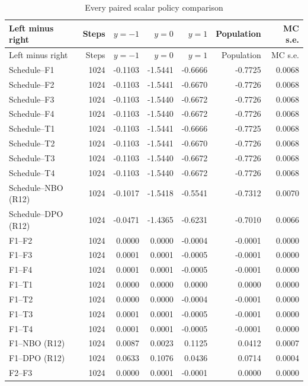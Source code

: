 \begingroup\small
\begin{longtable}{lrrrrrr}
\caption{Every paired scalar policy comparison}\label{tab:r15scalarpairs}\\
\toprule
Left minus right & Steps & $y=-1$ & $y=0$ & $y=1$ & Population & MC s.e. \\
\midrule
\endfirsthead
\toprule
Left minus right & Steps & $y=-1$ & $y=0$ & $y=1$ & Population & MC s.e. \\
\midrule
\endhead
Schedule--F1 & 1024 & -0.1103 & -1.5441 & -0.6666 & -0.7725 & 0.0068 \\
Schedule--F2 & 1024 & -0.1103 & -1.5441 & -0.6670 & -0.7726 & 0.0068 \\
Schedule--F3 & 1024 & -0.1103 & -1.5440 & -0.6672 & -0.7726 & 0.0068 \\
Schedule--F4 & 1024 & -0.1103 & -1.5440 & -0.6672 & -0.7726 & 0.0068 \\
Schedule--T1 & 1024 & -0.1103 & -1.5441 & -0.6666 & -0.7725 & 0.0068 \\
Schedule--T2 & 1024 & -0.1103 & -1.5441 & -0.6670 & -0.7726 & 0.0068 \\
Schedule--T3 & 1024 & -0.1103 & -1.5440 & -0.6672 & -0.7726 & 0.0068 \\
Schedule--T4 & 1024 & -0.1103 & -1.5440 & -0.6672 & -0.7726 & 0.0068 \\
Schedule--NBO (R12) & 1024 & -0.1017 & -1.5418 & -0.5541 & -0.7312 & 0.0070 \\
Schedule--DPO (R12) & 1024 & -0.0471 & -1.4365 & -0.6231 & -0.7010 & 0.0066 \\
F1--F2 & 1024 & 0.0000 & 0.0000 & -0.0004 & -0.0001 & 0.0000 \\
F1--F3 & 1024 & 0.0001 & 0.0001 & -0.0005 & -0.0001 & 0.0000 \\
F1--F4 & 1024 & 0.0001 & 0.0001 & -0.0005 & -0.0001 & 0.0000 \\
F1--T1 & 1024 & 0.0000 & 0.0000 & 0.0000 & 0.0000 & 0.0000 \\
F1--T2 & 1024 & 0.0000 & 0.0000 & -0.0004 & -0.0001 & 0.0000 \\
F1--T3 & 1024 & 0.0001 & 0.0001 & -0.0005 & -0.0001 & 0.0000 \\
F1--T4 & 1024 & 0.0001 & 0.0001 & -0.0005 & -0.0001 & 0.0000 \\
F1--NBO (R12) & 1024 & 0.0087 & 0.0023 & 0.1125 & 0.0412 & 0.0007 \\
F1--DPO (R12) & 1024 & 0.0633 & 0.1076 & 0.0436 & 0.0714 & 0.0004 \\
F2--F3 & 1024 & 0.0000 & 0.0001 & -0.0001 & 0.0000 & 0.0000 \\

\end{longtable}
